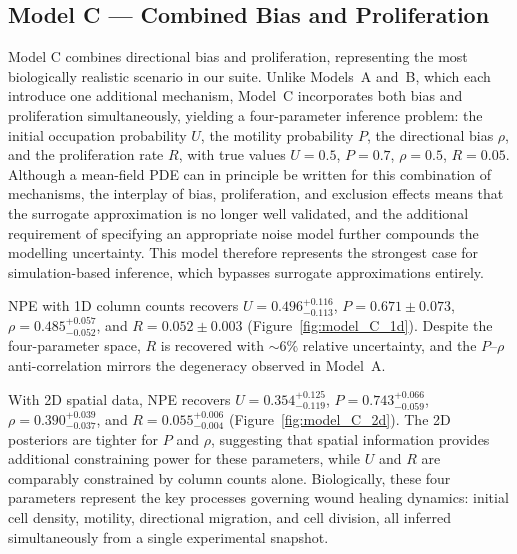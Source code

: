\documentclass{article}
\begin{document}
\subsection{Model C --- Combined Bias and Proliferation}\label{sec:model_c}

Model C combines directional bias and proliferation, representing the most biologically realistic scenario in our suite. Unlike Models~A and~B, which each introduce one additional mechanism, Model~C incorporates both bias and proliferation simultaneously, yielding a four-parameter inference problem: the initial occupation probability $U$, the motility probability $P$, the directional bias $\rho$, and the proliferation rate $R$, with true values $U = 0.5$, $P = 0.7$, $\rho = 0.5$, $R = 0.05$. Although a mean-field PDE can in principle be written for this combination of mechanisms, the interplay of bias, proliferation, and exclusion effects means that the surrogate approximation is no longer well validated, and the additional requirement of specifying an appropriate noise model further compounds the modelling uncertainty. This model therefore represents the strongest case for simulation-based inference, which bypasses surrogate approximations entirely.

NPE with 1D column counts recovers $U = 0.496^{+0.116}_{-0.113}$, $P = 0.671 \pm 0.073$, $\rho = 0.485^{+0.057}_{-0.052}$, and $R = 0.052 \pm 0.003$ (Figure~\ref{fig:model_C_1d}). Despite the four-parameter space, $R$ is recovered with ${\sim}6\%$ relative uncertainty, and the $P$--$\rho$ anti-correlation mirrors the degeneracy observed in Model~A.

With 2D spatial data, NPE recovers $U = 0.354^{+0.125}_{-0.119}$, $P = 0.743^{+0.066}_{-0.059}$, $\rho = 0.390^{+0.039}_{-0.037}$, and $R = 0.055^{+0.006}_{-0.004}$ (Figure~\ref{fig:model_C_2d}). The 2D posteriors are tighter for $P$ and $\rho$, suggesting that spatial information provides additional constraining power for these parameters, while $U$ and $R$ are comparably constrained by column counts alone. Biologically, these four parameters represent the key processes governing wound healing dynamics: initial cell density, motility, directional migration, and cell division, all inferred simultaneously from a single experimental snapshot.
\end{document}
